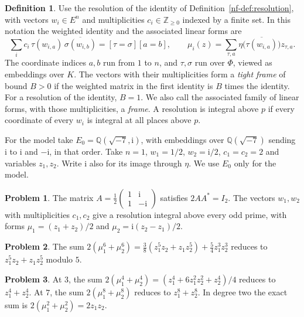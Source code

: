 \documentclass[reqno]{amsart}
\theoremstyle{plain}
\theoremstyle{definition}
\newtheorem{problem}{Problem}[section]
\newtheorem{definition}[theorem]{Definition}
\theoremstyle{remark}
\newcommand{\Z}{\mathbb Z}
\newcommand{\Q}{\mathbb Q}
\newcommand{\ii}{\mathrm i}
\begin{document}
\begin{definition}\label{def:resolution}
Use the resolution of the identity of Definition~\ref{nf-def:resolution}, with vectors \(w_i\in E^n\) and multiplicities \(c_i\in\Z_{\ge0}\) indexed by a finite set.  In this notation the weighted identity and the associated linear forms are
\[
 \sum_i c_i\,\tau(w_{i,a})\,\overline{\sigma(w_{i,b})}
   =[\tau=\sigma][a=b],\qquad
 \mu_i(z)=\sum_{\tau,a}\eta\bigl(\overline{\tau(w_{i,a})}\bigr)z_{\tau,a}.
\]
The coordinate indices \(a,b\) run from \(1\) to \(n\), and \(\tau,\sigma\) run over \(\Phi\), viewed as embeddings over \(K\).  The vectors with their multiplicities form a \emph{tight frame} of bound \(B>0\) if the weighted matrix in the first identity is \(B\) times the identity.  For a resolution of the identity, \(B=1\).  We also call the associated family of linear forms, with those multiplicities, a \emph{frame}.  A resolution is integral above \(p\) if every coordinate of every \(w_i\) is integral at all places above \(p\).
\end{definition}

For the model take \(E_0=\Q(\sqrt{-7},\ii)\), with embeddings over \(\Q(\sqrt{-7})\) sending \(\ii\) to \(\ii\) and \(-\ii\), in that order.  Take \(n=1\), \(w_1=1/2\), \(w_2=\ii/2\), \(c_1=c_2=2\) and variables \(z_1,z_2\).  Write \(\ii\) also for its image through \(\eta\).  We use \(E_0\) only for the model.

\begin{problem}\label{pr:frame}
The matrix \(A=\frac12\left(\begin{smallmatrix}1&\ii\\1&-\ii\end{smallmatrix}\right)\) satisfies \(2AA^*=I_2\).  The vectors \(w_1,w_2\) with multiplicities \(c_1,c_2\) give a resolution integral above every odd prime, with forms \(\mu_1=(z_1+z_2)/2\) and \(\mu_2=\ii(z_2-z_1)/2\).
\end{problem}

\begin{problem}\label{pr:five}
The sum \(2(\mu_1^6+\mu_2^6)=\frac38(z_1^5z_2+z_1z_2^5)+\frac54 z_1^3z_2^3\) reduces to \(z_1^5z_2+z_1z_2^5\) modulo \(5\).
\end{problem}

\begin{problem}\label{pr:three-seven}
At \(3\), the sum \(2(\mu_1^4+\mu_2^4)=(z_1^4+6z_1^2z_2^2+z_2^4)/4\) reduces to \(z_1^4+z_2^4\).  At \(7\), the sum \(2(\mu_1^8+\mu_2^8)\) reduces to \(z_1^8+z_2^8\).  In degree two the exact sum is \(2(\mu_1^2+\mu_2^2)=2z_1z_2\).
\end{problem}
\end{document}
